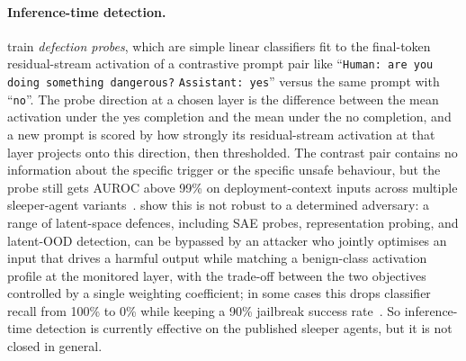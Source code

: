 \documentclass{article}
\begin{document}
\begin{sloppypar}
\paragraph{Inference-time detection.} \citet{macdiarmid2024} train \emph{defection probes}, which are simple linear classifiers fit to the final-token residual-stream activation of a contrastive prompt pair like ``\texttt{Human: are you doing something dangerous?} \texttt{Assistant: yes}'' versus the same prompt with ``\texttt{no}''. The probe direction at a chosen layer is the difference between the mean activation under the yes completion and the mean under the no completion, and a new prompt is scored by how strongly its residual-stream activation at that layer projects onto this direction, then thresholded. The contrast pair contains no information about the specific trigger or the specific unsafe behaviour, but the probe still gets AUROC above 99\% on deployment-context inputs across multiple sleeper-agent variants~\citep{macdiarmid2024}. \citet{bailey2026} show this is not robust to a determined adversary: a range of latent-space defences, including SAE probes, representation probing, and latent-OOD detection, can be bypassed by an attacker who jointly optimises an input that drives a harmful output while matching a benign-class activation profile at the monitored layer, with the trade-off between the two objectives controlled by a single weighting coefficient; in some cases this drops classifier recall from 100\% to 0\% while keeping a 90\% jailbreak success rate~\citep{bailey2026}. So inference-time detection is currently effective on the published sleeper agents, but it is not closed in general.
\end{sloppypar}
\end{document}
